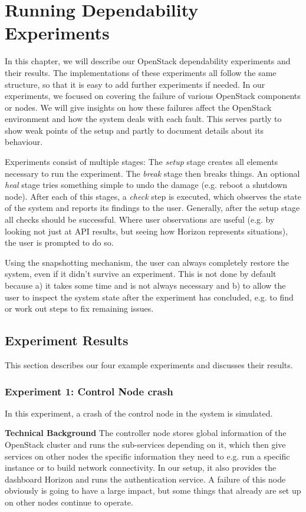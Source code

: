 \section{Running Dependability Experiments}
\label{experiments}
In this chapter, we will describe our OpenStack dependability experiments and their results. The implementations of these experiments all follow the same structure, so that it is easy to add further experiments if needed. In our experiments, we focused on covering the failure of various OpenStack components or nodes. We will give insights on how these failures affect the OpenStack environment and how the system deals with each fault. This serves partly to show weak points of the setup and partly to document details about its behaviour.

Experiments consist of multiple stages: The \emph{setup} stage creates all elements necessary to run the experiment. The \emph{break} stage then breaks things. An optional \emph{heal} stage tries something simple to undo the damage (e.g. reboot a shutdown node). After each of this stages, a \emph{check} step is executed, which observes the state of the system and reports its findings to the user. Generally, after the setup stage all checks should be successful. Where user observations are useful (e.g. by looking not just at API results, but seeing how Horizon represents situations), the user is prompted to do so.

Using the snapshotting mechanism, the user can always completely restore the system, even if it didn't survive an experiment. This is not done by default because a) it takes some time and is not always necessary and b) to allow the user to inspect the system state after the experiment has concluded, e.g. to find or work out steps to fix remaining issues.

\subsection{Experiment Results}
This section describes our four example experiments and discusses their results. 

\subsubsection{Experiment 1: Control Node crash}
In this experiment, a crash of the control node in the system is simulated. 

\textbf{Technical Background}
The controller node stores global information of the OpenStack cluster and runs the sub-services depending on it, which then give services on other nodes the specific information they need to e.g. run a specific instance or to build network connectivity. In our setup, it also provides the dashboard Horizon and runs the authentication service. A failure of this node obviously is going to have a large impact, but some things that already are set up on other nodes continue to operate.


